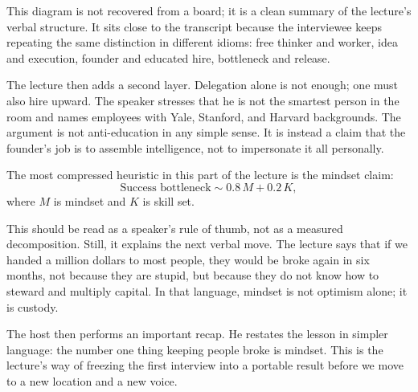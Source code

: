 \begin{figure}[h]
\centering
{}
\end{figure}

This diagram is not recovered from a board; it is a clean summary of the lecture's verbal structure. It sits close to the transcript because the interviewee keeps repeating the same distinction in different idioms: free thinker and worker, idea and execution, founder and educated hire, bottleneck and release.

The lecture then adds a second layer. Delegation alone is not enough; one must also hire upward. The speaker stresses that he is not the smartest person in the room and names employees with Yale, Stanford, and Harvard backgrounds. The argument is not anti-education in any simple sense. It is instead a claim that the founder's job is to assemble intelligence, not to impersonate it all personally.

The most compressed heuristic in this part of the lecture is the mindset claim:
\begin{equation}
\text{Success bottleneck} \sim 0.8\,M + 0.2\,K,
\end{equation}
where \(M\) is mindset and \(K\) is skill set.

This should be read as a speaker's rule of thumb, not as a measured decomposition. Still, it explains the next verbal move. The lecture says that if we handed a million dollars to most people, they would be broke again in six months, not because they are stupid, but because they do not know how to steward and multiply capital. In that language, mindset is not optimism alone; it is custody.

The host then performs an important recap. He restates the lesson in simpler language: the number one thing keeping people broke is mindset. This is the lecture's way of freezing the first interview into a portable result before we move to a new location and a new voice.

